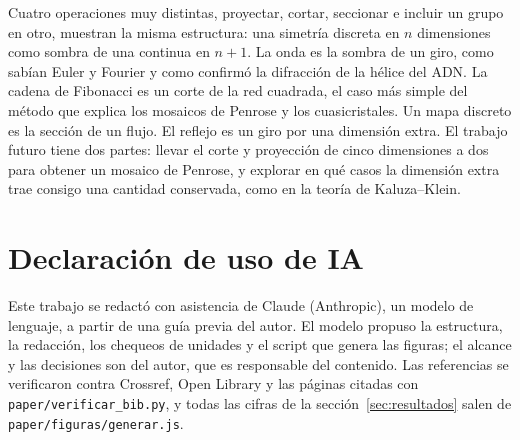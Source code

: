 \documentclass[11pt,a4paper]{article}
\begin{document}
Cuatro operaciones muy distintas, proyectar, cortar, seccionar e incluir un grupo en otro, muestran la misma estructura: una simetría discreta en $n$ dimensiones como sombra de una continua en $n+1$. La onda es la sombra de un giro, como sabían Euler y Fourier y como confirmó la difracción de la hélice del ADN. La cadena de Fibonacci es un corte de la red cuadrada, el caso más simple del método que explica los mosaicos de Penrose y los cuasicristales. Un mapa discreto es la sección de un flujo. El reflejo es un giro por una dimensión extra. El trabajo futuro tiene dos partes: llevar el corte y proyección de cinco dimensiones a dos para obtener un mosaico de Penrose, y explorar en qué casos la dimensión extra trae consigo una cantidad conservada, como en la teoría de Kaluza--Klein.

\section*{Declaración de uso de IA}

Este trabajo se redactó con asistencia de Claude (Anthropic), un modelo de lenguaje, a partir de una guía previa del autor. El modelo propuso la estructura, la redacción, los chequeos de unidades y el script que genera las figuras; el alcance y las decisiones son del autor, que es responsable del contenido. Las referencias se verificaron contra Crossref, Open Library y las páginas citadas con \texttt{paper/verificar\_bib.py}, y todas las cifras de la sección~\ref{sec:resultados} salen de \texttt{paper/figuras/generar.js}.

\printbibliography
\end{document}
